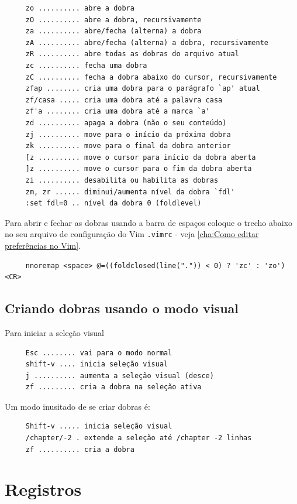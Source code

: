 \documentclass[10pt,a4paper,openany]{book}
\begin{document}
\begin{verbatim}
     zo .......... abre a dobra
     zO .......... abre a dobra, recursivamente
     za .......... abre/fecha (alterna) a dobra
     zA .......... abre/fecha (alterna) a dobra, recursivamente
     zR .......... abre todas as dobras do arquivo atual
     zc .......... fecha uma dobra
     zC .......... fecha a dobra abaixo do cursor, recursivamente
     zfap ........ cria uma dobra para o parágrafo `ap' atual
     zf/casa ..... cria uma dobra até a palavra casa
     zf'a ........ cria uma dobra até a marca `a'
     zd .......... apaga a dobra (não o seu conteúdo)
     zj .......... move para o início da próxima dobra
     zk .......... move para o final da dobra anterior
     [z .......... move o cursor para início da dobra aberta
     ]z .......... move o cursor para o fim da dobra aberta
     zi .......... desabilita ou habilita as dobras
     zm, zr ...... diminui/aumenta nível da dobra `fdl'
     :set fdl=0 .. nível da dobra 0 (foldlevel)
\end{verbatim}

Para abrir e fechar as dobras usando a barra de
espaços coloque o trecho abaixo no seu arquivo de configuração do Vim
\verb|.vimrc| - veja \ref{cha:Como editar preferências no Vim}.

\begin{verbatim}
     nnoremap <space> @=((foldclosed(line(".")) < 0) ? 'zc' : 'zo')<CR>
\end{verbatim}

\section{Criando dobras usando o modo visual}
\label{Criando folders usando o modo visual}
Para iniciar a seleção visual

\begin{verbatim}
     Esc ........ vai para o modo normal
     shift-v .... inicia seleção visual
     j .......... aumenta a seleção visual (desce)
     zf ......... cria a dobra na seleção ativa
\end{verbatim}

Um modo inusitado de se criar dobras é:

\begin{verbatim}
     Shift-v ..... inicia seleção visual
     /chapter/-2 . extende a seleção até /chapter -2 linhas
     zf .......... cria a dobra
\end{verbatim}

\chapter{Registros}
\label{Registros}
\end{document}
